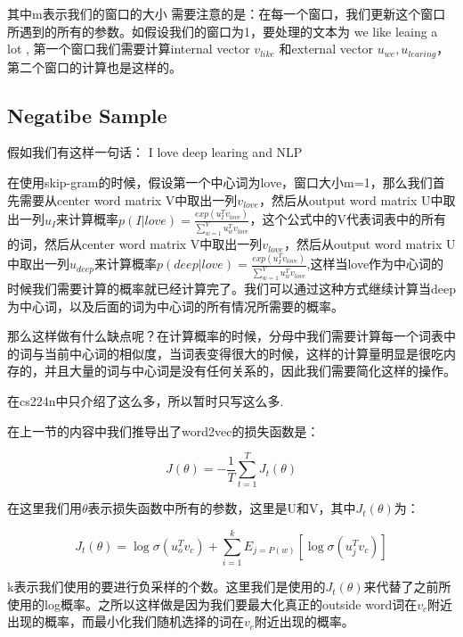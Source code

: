 	其中m表示我们的窗口的大小
	需要注意的是：在每一个窗口，我们更新这个窗口所遇到的所有的参数。如假设我们的窗口为1，要处理的文本为 we like leaing a lot , 第一个窗口我们需要计算internal vector $v_{like}$ 和external vector          $u_{we},u_{learing}$，第二个窗口的计算也是这样的。
	
	
	
	\subsection{Negatibe Sample}
	
	假如我们有这样一句话： I love deep learing and NLP
	
	在使用skip-gram的时候，假设第一个中心词为love，窗口大小m=1，那么我们首先需要从center word matrix V中取出一列$v_{love}$，然后从output word matrix U中取出一列$u_I$来计算概率$p(I|love) = \frac{exp(u_I^Tv_{love})}{\sum_{w=1}^V u_w^T v_{love}}$，这个公式中的V代表词表中的所有的词，然后从center word matrix V中取出一列$v_{love}$，然后从output word matrix U中取出一列$u_{deep}$来计算概率$p(deep|love) = \frac{exp(u_I^Tv_{love})}{\sum_{w=1}^V u_w^T v_{love}}$,这样当love作为中心词的时候我们需要计算的概率就已经计算完了。我们可以通过这种方式继续计算当deep为中心词，以及后面的词为中心词的所有情况所需要的概率。
	
	那么这样做有什么缺点呢？在计算概率的时候，分母中我们需要计算每一个词表中的词与当前中心词的相似度，当词表变得很大的时候，这样的计算量明显是很吃内存的，并且大量的词与中心词是没有任何关系的，因此我们需要简化这样的操作。
	
	
	在cs224n中只介绍了这么多，所以暂时只写这么多.
	
	在上一节的内容中我们推导出了word2vec的损失函数是：
	
	\begin{equation}
	J(\theta) = -\frac{1}{T} \sum_{t=1}^{T} J_t(\theta) 
	\end{equation}
	
	在这里我们用$\theta$表示损失函数中所有的参数，这里是U和V，其中$J_t(\theta) $为：
	
	\begin{equation}
	J_t(\theta) = \log \sigma(u_o^T v_c) + \sum_{i=1}^{k}E_{j=P(w)}[\log \sigma(u_j^T v_c)]
	\end{equation}
	
	k表示我们使用的要进行负采样的个数。这里我们是使用的$J_t(\theta)$来代替了之前所使用的log概率。之所以这样做是因为我们要最大化真正的outside word词在$v_c$附近出现的概率，而最小化我们随机选择的词在$v_c$附近出现的概率。
	
